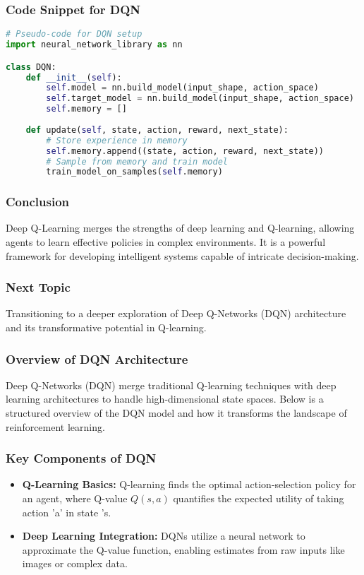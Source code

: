 \documentclass[aspectratio=169]{beamer}
\begin{document}
\begin{frame}[fragile]
    \frametitle{Code Snippet for DQN}
    \begin{lstlisting}[language=Python]
# Pseudo-code for DQN setup
import neural_network_library as nn

class DQN:
    def __init__(self):
        self.model = nn.build_model(input_shape, action_space)
        self.target_model = nn.build_model(input_shape, action_space)
        self.memory = []
        
    def update(self, state, action, reward, next_state):
        # Store experience in memory
        self.memory.append((state, action, reward, next_state))
        # Sample from memory and train model
        train_model_on_samples(self.memory)
    \end{lstlisting}
\end{frame}

\begin{frame}[fragile]
    \frametitle{Conclusion}
    Deep Q-Learning merges the strengths of deep learning and Q-learning, allowing agents to learn effective policies in complex environments. It is a powerful framework for developing intelligent systems capable of intricate decision-making.
\end{frame}

\begin{frame}[fragile]
    \frametitle{Next Topic}
    Transitioning to a deeper exploration of Deep Q-Networks (DQN) architecture and its transformative potential in Q-learning.
\end{frame}

\begin{frame}[fragile]
    \frametitle{Overview of DQN Architecture}
    Deep Q-Networks (DQN) merge traditional Q-learning techniques with deep learning architectures to handle high-dimensional state spaces. Below is a structured overview of the DQN model and how it transforms the landscape of reinforcement learning.
\end{frame}

\begin{frame}[fragile]
    \frametitle{Key Components of DQN}
    \begin{itemize}
        \item \textbf{Q-Learning Basics:} 
        Q-learning finds the optimal action-selection policy for an agent, where Q-value $Q(s, a)$ quantifies the expected utility of taking action 'a' in state 's.
        
        \item \textbf{Deep Learning Integration:} 
        DQNs utilize a neural network to approximate the Q-value function, enabling estimates from raw inputs like images or complex data.
    \end{itemize}
\end{frame}
\end{document}
